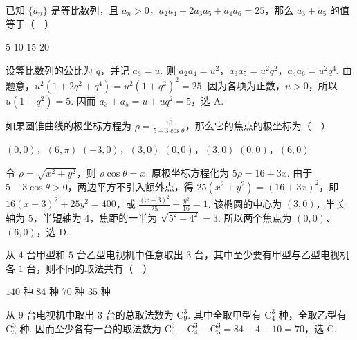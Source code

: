 \documentclass[UTF8,a4paper,oneside,11pt]{ctexbook}
\begin{document}
\begin{problem}
已知 \(\{a_n\}\) 是等比数列，且 \(a_n>0\)，\(a_2a_4+2a_3a_5+a_4a_6=25\)，那么 \(a_3+a_5\) 的值等于（\(\quad\)）

\choices
    {\(5\)}
    {\(10\)}
    {\(15\)}
    {\(20\)}


\begin{solution}
设等比数列的公比为 \(q\)，并记 \(a_3=u\). 则 \(a_2a_4=u^2\)，\(a_3a_5=u^2q^2\)，\(a_4a_6=u^2q^4\). 由题意，\(u^2\left(1+2q^2+q^4\right)=u^2\left(1+q^2\right)^2=25\). 因为各项为正数，\(u>0\)，所以 \(u(1+q^2)=5\). 因而 \(a_3+a_5=u+uq^2=5\)，选 A.
\end{solution}
\end{problem}

\begin{problem}
如果圆锥曲线的极坐标方程为 \(\rho=\frac{16}{5-3\cos\theta}\)，那么它的焦点的极坐标为（\(\quad\)）

\choices
    {\(\left(0,0\right)\)，\(\left(6,\pi\right)\)}
    {\(\left(-3,0\right)\)，\(\left(3,0\right)\)}
    {\(\left(0,0\right)\)，\(\left(3,0\right)\)}
    {\(\left(0,0\right)\)，\(\left(6,0\right)\)}


\begin{solution}
令 \(\rho=\sqrt{x^2+y^2}\)，则 \(\rho\cos\theta=x\). 原极坐标方程化为 \(5\rho=16+3x\). 由于 \(5-3\cos\theta>0\)，两边平方不引入额外点，得 \(25(x^2+y^2)=(16+3x)^2\)，即 \(16(x-3)^2+25y^2=400\)，或 \(\frac{(x-3)^2}{25}+\frac{y^2}{16}=1\). 该椭圆的中心为 \((3,0)\)，半长轴为 \(5\)，半短轴为 \(4\)，焦距的一半为 \(\sqrt{5^2-4^2}=3\). 所以两个焦点为 \((0,0)\)、\((6,0)\)，选 D.
\end{solution}
\end{problem}

\begin{problem}
从 \(4\) 台甲型和 \(5\) 台乙型电视机中任意取出 \(3\) 台，其中至少要有甲型与乙型电视机各 \(1\) 台，则不同的取法共有（\(\quad\)）

\choices
    {\(140\) 种}
    {\(84\) 种}
    {\(70\) 种}
    {\(35\) 种}


\begin{solution}
从 \(9\) 台电视机中取出 \(3\) 台的总取法数为 \(\mathrm C_9^3\). 其中全取甲型有 \(\mathrm C_4^3\) 种，全取乙型有 \(\mathrm C_5^3\) 种. 因而至少各有一台的取法数为 \(\mathrm C_9^3-\mathrm C_4^3-\mathrm C_5^3=84-4-10=70\)，选 C.
\end{solution}
\end{problem}
\end{document}
